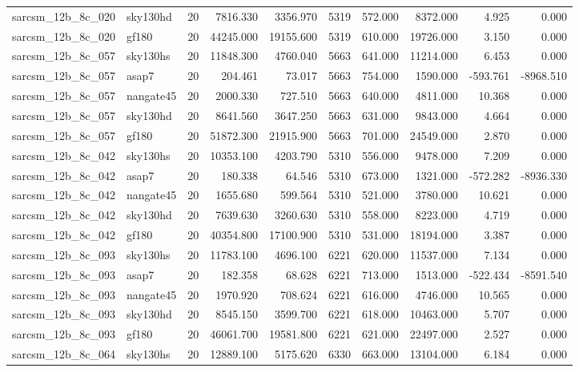 \begin{longtable}{llrrrrrrrr}
sarcsm\_12b\_8c\_020 & sky130hd & 20 & 7816.330 & 3356.970 & 5319 & 572.000 & 8372.000 & 4.925 & 0.000 \\
sarcsm\_12b\_8c\_020 & gf180 & 20 & 44245.000 & 19155.600 & 5319 & 610.000 & 19726.000 & 3.150 & 0.000 \\
sarcsm\_12b\_8c\_057 & sky130hs & 20 & 11848.300 & 4760.040 & 5663 & 641.000 & 11214.000 & 6.453 & 0.000 \\
sarcsm\_12b\_8c\_057 & asap7 & 20 & 204.461 & 73.017 & 5663 & 754.000 & 1590.000 & -593.761 & -8968.510 \\
sarcsm\_12b\_8c\_057 & nangate45 & 20 & 2000.330 & 727.510 & 5663 & 640.000 & 4811.000 & 10.368 & 0.000 \\
sarcsm\_12b\_8c\_057 & sky130hd & 20 & 8641.560 & 3647.250 & 5663 & 631.000 & 9843.000 & 4.664 & 0.000 \\
sarcsm\_12b\_8c\_057 & gf180 & 20 & 51872.300 & 21915.900 & 5663 & 701.000 & 24549.000 & 2.870 & 0.000 \\
sarcsm\_12b\_8c\_042 & sky130hs & 20 & 10353.100 & 4203.790 & 5310 & 556.000 & 9478.000 & 7.209 & 0.000 \\
sarcsm\_12b\_8c\_042 & asap7 & 20 & 180.338 & 64.546 & 5310 & 673.000 & 1321.000 & -572.282 & -8936.330 \\
sarcsm\_12b\_8c\_042 & nangate45 & 20 & 1655.680 & 599.564 & 5310 & 521.000 & 3780.000 & 10.621 & 0.000 \\
sarcsm\_12b\_8c\_042 & sky130hd & 20 & 7639.630 & 3260.630 & 5310 & 558.000 & 8223.000 & 4.719 & 0.000 \\
sarcsm\_12b\_8c\_042 & gf180 & 20 & 40354.800 & 17100.900 & 5310 & 531.000 & 18194.000 & 3.387 & 0.000 \\
sarcsm\_12b\_8c\_093 & sky130hs & 20 & 11783.100 & 4696.100 & 6221 & 620.000 & 11537.000 & 7.134 & 0.000 \\
sarcsm\_12b\_8c\_093 & asap7 & 20 & 182.358 & 68.628 & 6221 & 713.000 & 1513.000 & -522.434 & -8591.540 \\
sarcsm\_12b\_8c\_093 & nangate45 & 20 & 1970.920 & 708.624 & 6221 & 616.000 & 4746.000 & 10.565 & 0.000 \\
sarcsm\_12b\_8c\_093 & sky130hd & 20 & 8545.150 & 3599.700 & 6221 & 618.000 & 10463.000 & 5.707 & 0.000 \\
sarcsm\_12b\_8c\_093 & gf180 & 20 & 46061.700 & 19581.800 & 6221 & 621.000 & 22497.000 & 2.527 & 0.000 \\
sarcsm\_12b\_8c\_064 & sky130hs & 20 & 12889.100 & 5175.620 & 6330 & 663.000 & 13104.000 & 6.184 & 0.000 \\

\end{longtable}
